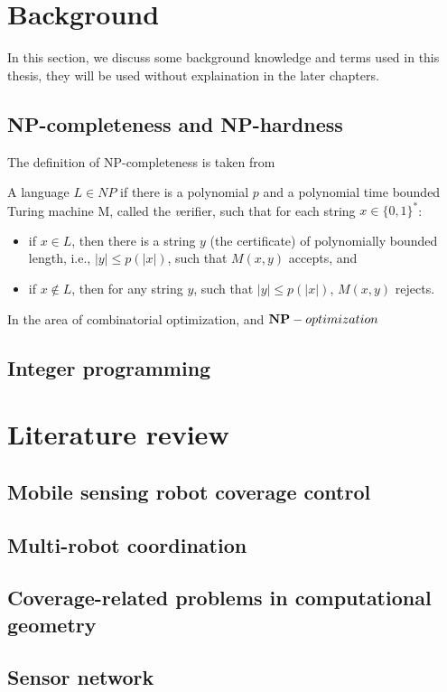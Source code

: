 \section{Background}
In this section, we discuss some background knowledge and terms used in this thesis,
they will be used without explaination in the later chapters. 

\subsection{NP-completeness and NP-hardness}
The definition of NP-completeness is taken from \cite{vazirani2001approximation}
\begin{definition}[NP-completeness]
    A language $L\in NP$ if there is a polynomial $p$ and a polynomial time bounded Turing machine M, 
    called the {\textit verifier}, such that for each string $x\in \{0, 1\}^*$: 
\begin{itemize}
    \item if $x\in L$, then there is a string $y$ (the certificate) of polynomially bounded length, i.e., $|y| \leq p(|x|)$,
    such that $M(x, y)$ accepts, and 
    \item if $x\notin L$, then for any string $y$, such that $|y|\leq p(|x|)$, $M(x,y)$ rejects.
\end{itemize}
\end{definition}

In the area of combinatorial optimization, and ${\bold{NP}}-optimization$ 
\subsection{Integer programming}

\section{Literature review} 
\subsection{Mobile sensing robot coverage control}
\subsection{Multi-robot coordination}
\subsection{Coverage-related problems in computational geometry}
\subsection{Sensor network}
